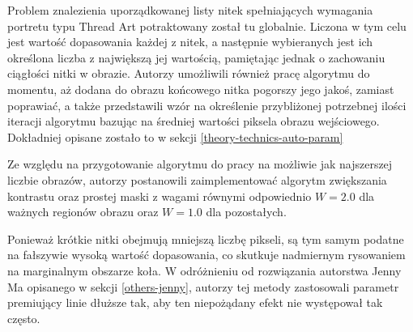 \documentclass[a4paper, 12pt, polish, twoside]{extreport}
\begin{document}
        Problem znalezienia uporządkowanej listy nitek spełniających wymagania portretu typu Thread Art potraktowany został tu globalnie. Liczona w tym celu jest wartość dopasowania każdej z nitek, a następnie wybieranych jest ich określona liczba z największą jej wartością, pamiętając jednak o zachowaniu ciągłości nitki w obrazie. Autorzy umożliwili również pracę algorytmu do momentu, aż dodana do obrazu końcowego nitka pogorszy jego jakoś, zamiast poprawiać, a także przedstawili wzór na określenie przybliżonej potrzebnej ilości iteracji algorytmu bazując na średniej wartości piksela obrazu wejściowego. Dokładniej opisane zostało to w sekcji \ref{theory-technics-auto-param}
        
        Ze względu na przygotowanie algorytmu do pracy na możliwie jak najszerszej liczbie obrazów, autorzy postanowili zaimplementować algorytm zwiększania kontrastu oraz prostej maski z wagami równymi odpowiednio \(W = 2.0\) dla ważnych regionów obrazu oraz \(W = 1.0\) dla pozostałych.
        
        Ponieważ krótkie nitki obejmują mniejszą liczbę pikseli, są tym samym podatne na fałszywie wysoką wartość dopasowania, co skutkuje nadmiernym rysowaniem na marginalnym obszarze koła. W odróżnieniu od rozwiązania autorstwa Jenny Ma opisanego w sekcji \ref{others-jenny}, autorzy tej metody zastosowali parametr premiujący linie dłuższe tak, aby ten niepożądany efekt nie występował tak często. 
        
\end{document}

